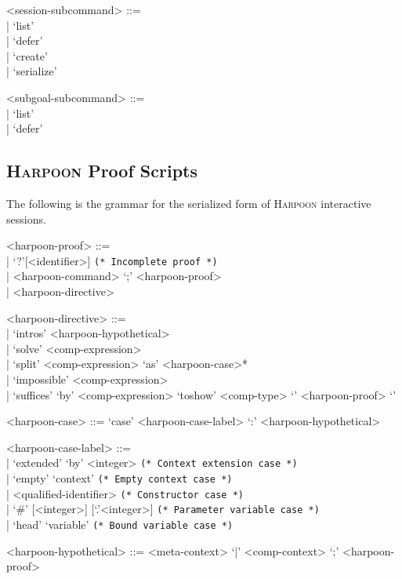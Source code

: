 \documentclass[11pt]{article}
\newcommand{\Harpoon}{\textsc{Harpoon}\xspace}
\begin{document}
\begin{grammar}
<session-subcommand> ::= \hfill\\
| `list'\\
| `defer'\\
| `create'\\
| `serialize'

<subgoal-subcommand> ::= \hfill\\
| `list'\\
| `defer'
\end{grammar}

\subsection{\Harpoon Proof Scripts}\label{section:syntax-harpoon-proof-scripts}

The following is the grammar for the serialized form of \Harpoon interactive sessions.

\begin{grammar}
<harpoon-proof> ::= \hfill\\
| `?'[<identifier>] \hfill \texttt{(* Incomplete proof *)}\\
| <harpoon-command> `;' <harpoon-proof>\\
| <harpoon-directive>


<harpoon-directive> ::= \hfill\\
| `intros' <harpoon-hypothetical>\\
| `solve' <comp-expression>\\
| `split' <comp-expression> `as' <harpoon-case>*\\
| `impossible' <comp-expression>\\
| `suffices' `by' <comp-expression> `toshow' <comp-type> `{' <harpoon-proof> `}'

<harpoon-case> ::= `case' <harpoon-case-label> `:' <harpoon-hypothetical>

<harpoon-case-label> ::= \hfill\\
| `extended' `by' <integer> \hfill \texttt{(* Context extension case *)}\\
| `empty' `context' \hfill \texttt{(* Empty context case *)}\\
| <qualified-identifier> \hfill \texttt{(* Constructor case *)}\\
| `#' [<integer>] [`.'<integer>] \hfill \texttt{(* Parameter variable case *)}\\
| `head' `variable' \hfill \texttt{(* Bound variable case *)}

<harpoon-hypothetical> ::= <meta-context> `|' <comp-context> `;' <harpoon-proof>
\end{grammar}
\end{document}
